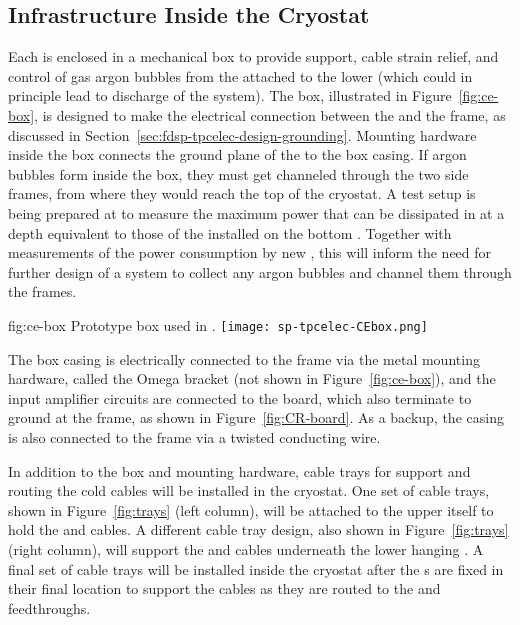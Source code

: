\subsection{Infrastructure Inside the Cryostat}
\label{sec:fdsp-tpcelec-design-infrastructure}

Each  is enclosed in a mechanical  box 
to provide support, cable strain relief, and control of gas 
argon bubbles %
from the  attached 
to the lower  (which could in principle lead to 
discharge of the  system). The  box, 
illustrated in Figure~\ref{fig:ce-box}, is designed to make the 
electrical connection between the  and the  
frame, as discussed %
in Section~\ref{sec:fdsp-tpcelec-design-grounding}.
Mounting hardware inside the  box connects the ground plane 
of the  to the box casing. If argon bubbles %
form inside
the  box, they must get %
channeled through the two side
 frames, from where they would reach the top of the cryostat.
A test setup is being prepared at  to measure the
maximum power that can be dissipated in  at a
depth equivalent to those of the  installed on
the bottom . Together with measurements of the
power consumption by new , this will inform
the need for further design of a system to collect any
argon bubbles and channel them through the  frames.

\begin{dunefigure}
{fig:ce-box}
{Prototype  box used in .}
\texttt{[image: sp-tpcelec-CEbox.png]}
\end{dunefigure}

The  box casing is electrically connected to the 
 frame via the metal mounting hardware, called the 
Omega bracket (not shown in Figure~\ref{fig:ce-box}), and the 
input amplifier circuits are connected to the  board, 
which also terminate to ground at the  frame, as 
shown in Figure~\ref{fig:CR-board}. 
As a backup, the casing is 
also connected to the  frame via a twisted conducting wire.

In addition to the  box and mounting hardware, cable trays 
for support and routing the cold cables will be installed in the 
cryostat. One set of cable trays, shown in Figure~\ref{fig:trays} 
(left column), will be attached to the upper  itself 
to hold the  and  cables. A different cable 
tray design, also shown in Figure~\ref{fig:trays} (right column), 
will support the  and  cables underneath the 
lower hanging . A final set of cable trays will be 
installed inside the cryostat after the s are 
fixed in their final location to support the cables as they are 
routed to the  and  feedthroughs.

